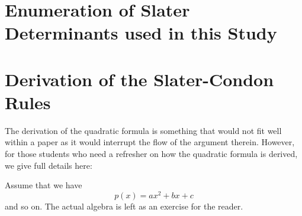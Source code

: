 \documentclass[final,3p,times,twocolumn]{elsarticle}
\begin{document}
\appendix
\section{Enumeration of Slater Determinants used in this Study} \label{app:det}

\section{Derivation of the Slater-Condon Rules}
\label{app:slatercondon}
The derivation of the quadratic formula is something that would not
fit well within a paper as it would interrupt the flow of the argument
therein. However, for those students who need a refresher on how the
quadratic formula is derived, we give full details here:\par
Assume that we have
\begin{equation}
p(x) = ax^2 + bx + c
\end{equation}
and so on. The actual algebra is left as an exercise for the reader.











\end{document}
